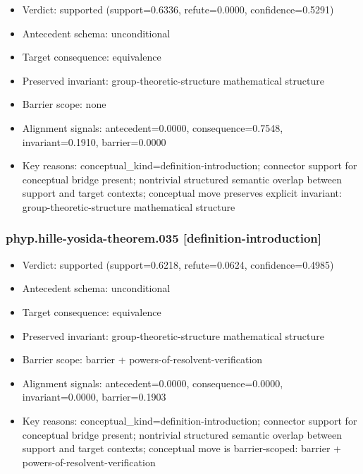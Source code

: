 \documentclass[
]{article}
\newcounter{none} %
\providecommand{\tightlist}{%
  \setlength{\itemsep}{0pt}\setlength{\parskip}{0pt}}
\begin{document}
\begin{itemize}
\tightlist
\item
  Verdict: supported (support=0.6336, refute=0.0000, confidence=0.5291)
\item
  Antecedent schema: unconditional
\item
  Target consequence: equivalence
\item
  Preserved invariant: group-theoretic-structure mathematical structure
\item
  Barrier scope: none
\item
  Alignment signals: antecedent=0.0000, consequence=0.7548,
  invariant=0.1910, barrier=0.0000
\item
  Key reasons: conceptual\_kind=definition-introduction; connector
  support for conceptual bridge present; nontrivial structured semantic
  overlap between support and target contexts; conceptual move preserves
  explicit invariant: group-theoretic-structure mathematical structure
\end{itemize}

\subsubsection{phyp.hille-yosida-theorem.035
{[}definition-introduction{]}}\label{phyphille-yosida-theorem035-definition-introduction}

\begin{itemize}
\tightlist
\item
  Verdict: supported (support=0.6218, refute=0.0624, confidence=0.4985)
\item
  Antecedent schema: unconditional
\item
  Target consequence: equivalence
\item
  Preserved invariant: group-theoretic-structure mathematical structure
\item
  Barrier scope: barrier + powers-of-resolvent-verification
\item
  Alignment signals: antecedent=0.0000, consequence=0.0000,
  invariant=0.0000, barrier=0.1903
\item
  Key reasons: conceptual\_kind=definition-introduction; connector
  support for conceptual bridge present; nontrivial structured semantic
  overlap between support and target contexts; conceptual move is
  barrier-scoped: barrier + powers-of-resolvent-verification
\end{itemize}
\end{document}

